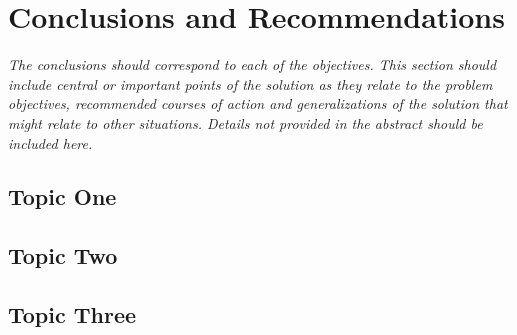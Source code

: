 \chapter{Conclusions and Recommendations}
\label{cha:Conclusions}      %

\emph{The conclusions should correspond to each of the objectives. 
This section should include central or important points of the solution as they relate to the problem objectives, recommended courses of action and generalizations of the solution that might relate to other situations. 
Details not provided in the abstract should be included here.\\
}
\section{Topic One}
\lipsum[1]
\section{Topic Two}
\lipsum[2]
\section{Topic Three}
\lipsum[3]